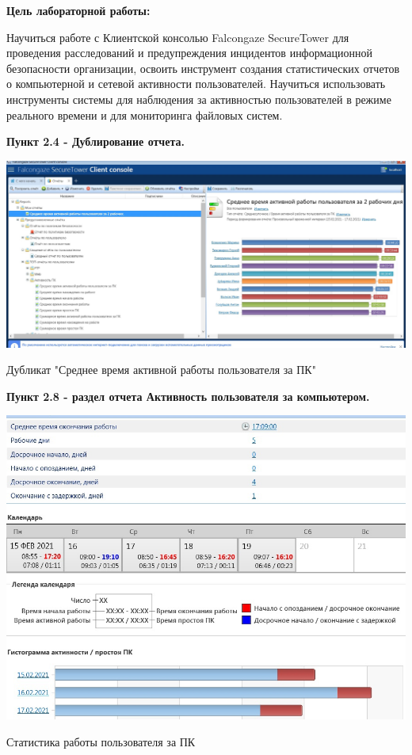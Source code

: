 \documentclass[a4paper,14pt]{extarticle}
\begin{document}
    \textbf{Цель лабораторной работы:}

    Научиться работе с Клиентской консолью Falcongaze SecureTower для проведения расследований и предупреждения инцидентов
    информационной безопасности организации, освоить инструмент создания статистических отчетов о компьютерной и сетевой активности 
    пользователей. Научиться использовать инструменты системы для наблюдения за активностью пользователей в режиме реального времени 
    и для мониторинга файловых систем.

    \textbf{Пункт 2.4 - Дублирование отчета.} 
    \begin{center}
        \includegraphics[scale=0.25]{pics/2.4.jpg}

        Дубликат "Среднее время активной работы пользователя за ПК"
    \end{center}

    \textbf{Пункт 2.8 - раздел отчета Активность пользователя за компьютером.} 
    \begin{center}
        \includegraphics[scale=0.3]{pics/2.8.jpg}
        
        Статистика работы пользователя за ПК
    \end{center}
\end{document}
